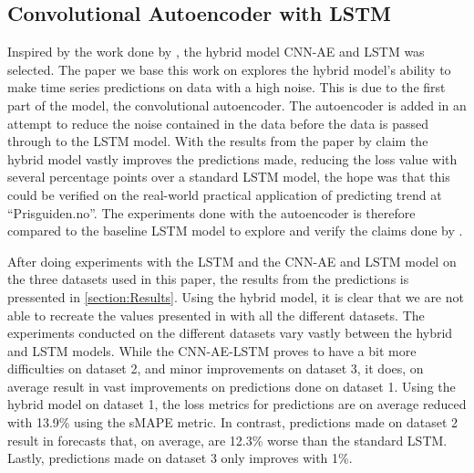 
\subsection{Convolutional Autoencoder with LSTM}
\label{section:Discussion:Discussion:CNN-AE-LSTM}



Inspired by the work done by \cite{Zhao2019}, the hybrid model CNN-AE and LSTM was selected.
The paper we base this work on explores the hybrid model's ability to make time series predictions
on data with a high noise.
This is due to the first part of the model, the convolutional autoencoder.
The autoencoder is added in an attempt to reduce the noise contained in the data before the data is passed through to the LSTM model.
With the results from the paper by \cite{Zhao2019} claim the hybrid model vastly improves the predictions made, reducing the loss value with
several percentage points over a standard LSTM model, the hope was that this could be verified on the real-world practical application of
predicting trend at ``Prisguiden.no''.
The experiments done with the autoencoder is therefore compared to the baseline LSTM model to explore and verify the claims done by
\cite{Zhao2019}.


After doing experiments with the LSTM and the CNN-AE and LSTM model on the three datasets used in this paper,
the results from the predictions is pressented in \cref{section:Results}.
Using the hybrid model, it is clear that we are not able to recreate the values presented in \cite{Zhao2019}
with all the different datasets.
The experiments conducted on the different datasets vary vastly between the hybrid and LSTM models.
While the CNN-AE-LSTM proves to have a bit more difficulties on dataset 2, and minor improvements on dataset 3,
it does, on average result in vast improvements on predictions done on dataset 1.
Using the hybrid model on dataset 1, the loss metrics for predictions are on average reduced with 13.9\% using the sMAPE metric.
In contrast, predictions made on dataset 2 result in forecasts that, on average, are 12.3\% worse than the standard LSTM.
Lastly, predictions made on dataset 3 only improves with 1\%.

